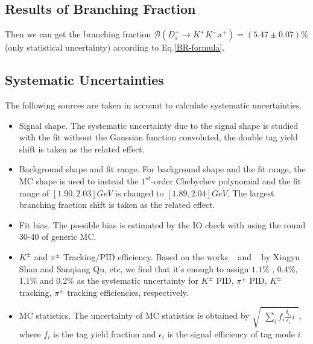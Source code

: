 {    \subsection{Results of Branching Fraction}



    Then we can get the branching fraction $\mathcal{B}(D_{s}^{+} \rightarrow K^{+}K^{-}\pi^{+})=(5.47\pm0.07)\%$(only statistical uncertainty) according to Eq.\ref{BR-formula}.

    \subsection{Systematic Uncertainties}
    The following sources are taken in account to calculate systematic uncertainties.

    \begin{itemize}
        \item Signal shape. The systematic uncertainty due to the signal shape is studied with the fit without the Gaussian function convoluted, the double tag yield shift is taken as the related effect. 

        \item Background shape and fit range. For background shape and the fit range, the MC shape is used to instead the $1^{st}$-order Chebychev polynomial and the fit range of $[1.90, 2.03]GeV$ is changed to $[1.89, 2.04]GeV$. 
            The largest branching fraction shift is taken as the related effect.
        
        \item Fit bias. The possible bias is estimated by the IO check with using the round 30-40 of generic MC.
            
        \item $K^{\pm}$ and $\pi^{\pm}$ Tracking/PID efficiency. Based on the works ~\cite{PID} and ~\cite{Tracking} by Xingyu Shan and Sanqiang Qu, etc, 
            we find that it's enough to assign $1.1\%$ , $0.4\%$, $1.1\%$ and $0.2\%$ as the systematic uncertainty for $K^{\pm}$ PID, $\pi^{\pm}$ PID,  $K^{\pm}$ tracking, $\pi^{\pm}$ tracking efficiencies, respectively.
    
    \item MC statistics. The uncertainty of MC statistics is obtained by $\sqrt{ \begin{matrix} \sum_{i} f_{i}\frac{\delta_{\epsilon_{i}}}{\epsilon_{i}}i\end{matrix}}$, where $f_{i}$ is the tag yield fraction and $\epsilon_{i}$ is the signal efficiency of tag mode $i$.
    \end{itemize}

}
